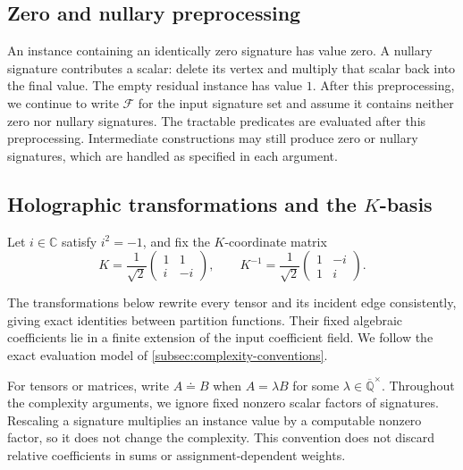\documentclass[11pt,letterpaper,onecolumn]{article}
\theoremstyle{plain}
\theoremstyle{definition}
\theoremstyle{remark}
\newcommand{\AlgNums}{\overline{\mathbb Q}}
\newcommand{\cF}{\mathcal F}
\begin{document}
\subsection{Zero and nullary preprocessing}
\label{subsec:zero-nullary}

An instance containing an identically zero signature has value zero.
A nullary signature contributes a scalar: delete its vertex and multiply
that scalar back into the final value. The empty residual instance has
value \(1\). After this preprocessing, we continue to write \(\cF\) for
the input signature set and assume it contains neither zero nor nullary
signatures. The tractable predicates are evaluated after this preprocessing.
Intermediate constructions may still produce zero or nullary signatures,
which are handled as specified in each argument.

\subsection{Holographic transformations and the
  \texorpdfstring{\(K\)}{K}-basis}
\label{subsec:holographic}

Let \(i\in\mathbb C\) satisfy \(i^2=-1\), and fix the \(K\)-coordinate matrix
\hypertarget{eq:K-matrix}{}
\begin{equation*}
  K=\frac1{\sqrt2}
  \begin{pmatrix}1&1\\ i&-i\end{pmatrix},
  \qquad
  K^{-1}=\frac1{\sqrt2}
  \begin{pmatrix}1&-i\\1&i\end{pmatrix}.
\end{equation*}

The transformations below rewrite every tensor and its incident edge
consistently, giving exact identities between partition functions.  Their
fixed algebraic coefficients lie in a finite extension of the input
coefficient field.  We follow the exact evaluation model of
\cref{subsec:complexity-conventions}.

For tensors or matrices, write \(A\doteq B\) when
\(A=\lambda B\) for some \(\lambda\in\AlgNums^\times\).
Throughout the complexity arguments, we ignore fixed nonzero scalar
factors of signatures.  Rescaling a signature multiplies an instance value
by a computable nonzero factor, so it does not change the complexity.
This convention does not discard relative coefficients in sums or
assignment-dependent weights.  
\end{document}
